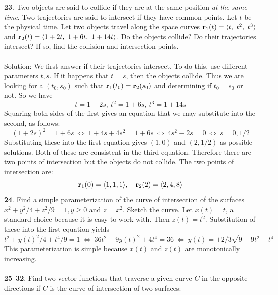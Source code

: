 \documentclass[12pt]{amsbook}
\newcommand{\la}{\langle}
\newcommand{\ra}{\rangle}
\begin{document}
{\small\bf 23}. Two objects are said to collide if they are at the same position \textit{at the
same time}. Two trajectories are said to intersect if they have common points.
Let $t$ be the physical time. Let two objects travel along the space curves ${\bf r}_1(t) = \la t, \ t^2, \ t^3 \ra$ and ${\bf r}_2(t) = \la 1 + 2t, \ 1 + 6t,  \ 1 + 14t\ra $. Do the objects collide?
Do their trajectories intersect? If so, find the collision and intersection
points. 
\\
\\
{\sc Solution}: We first answer if their trajectories intersect. To do this, use different parameters $t,s$. If it happens that $t=s$, then the objects collide. Thus we are looking for a $(t_0,s_0)$ such that ${\bf r}_1(t_0)={\bf r}_2(s_0)$ and determining if $t_0=s_0$ or not. So we have
$$t=1+2s, \ t^2=1+6s, \ t^3=1+14s$$
Squaring both sides of the first gives an equation that we may substitute into the second, as follows:
$$(1+2s)^2=1+6s \ \Leftrightarrow \ 1+4s+4s^2=1+6s \ \Leftrightarrow \ 4s^2-2s=0 \ \Leftrightarrow \ s=0,1/2$$
Substituting these into the first equation gives $(1,0)$ and $(2,1/2)$ as possible solutions. Both of these are consistent in the third equation. Therefore there are two points of intersection but the objects do not collide. The two points of intersection are:
$${\bf r}_1(0)=\la 1,1,1 \ra, \ \ \ {\bf r}_2(2)=\la 2,4,8 \ra$$
{\small\bf 24}. Find a simple parameterization of the curve of intersection of the surfaces $x^2+y^2/4+z^2/9=1, y\geq 0$ and $z=x^2$. Sketch the curve. Let $x(t)=t$, a standard choice because it is easy to work with. Then $z(t)=t^2$. Substitution of these into the first equation yields
$$t^2+y(t)^2/4+t^4/9=1 \ \Leftrightarrow \ 36t^2+9y(t)^2+4t^4=36 \ \Leftrightarrow \ y(t)=\pm 2/3\sqrt{9-9t^2-t^4}$$
This parameterization is simple because $x(t)$ and $z(t)$ are monotonically increasing. 
\\
\\
\noindent
{\small {\bf 25}--{\bf 32}}. Find two vector functions that traverse a given curve $C$ in the
opposite directions if $C$ is the curve of intersection of two surfaces:
\end{document}
